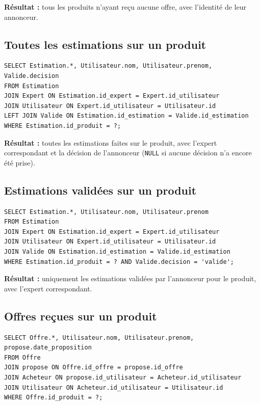 \documentclass{article}
\theoremstyle{plain}
\theoremstyle{definition}
\begin{document}
\noindent\textbf{Résultat :} tous les produits n'ayant reçu aucune
offre, avec l'identité de leur annonceur.
 
\subsection*{Toutes les estimations sur un produit}
 
\begin{verbatim}
SELECT Estimation.*, Utilisateur.nom, Utilisateur.prenom, Valide.decision
FROM Estimation
JOIN Expert ON Estimation.id_expert = Expert.id_utilisateur
JOIN Utilisateur ON Expert.id_utilisateur = Utilisateur.id
LEFT JOIN Valide ON Estimation.id_estimation = Valide.id_estimation
WHERE Estimation.id_produit = ?;
\end{verbatim}
 
\noindent\textbf{Résultat :} toutes les estimations faites sur le
produit, avec l'expert correspondant et la décision de l'annonceur
(\texttt{NULL} si aucune décision n'a encore été prise).
 
\subsection*{Estimations validées sur un produit}
 
\begin{verbatim}
SELECT Estimation.*, Utilisateur.nom, Utilisateur.prenom
FROM Estimation
JOIN Expert ON Estimation.id_expert = Expert.id_utilisateur
JOIN Utilisateur ON Expert.id_utilisateur = Utilisateur.id
JOIN Valide ON Estimation.id_estimation = Valide.id_estimation
WHERE Estimation.id_produit = ? AND Valide.decision = 'valide';
\end{verbatim}
 
\noindent\textbf{Résultat :} uniquement les estimations validées par
l'annonceur pour le produit, avec l'expert correspondant.
 
\subsection*{Offres reçues sur un produit}
 
\begin{verbatim}
SELECT Offre.*, Utilisateur.nom, Utilisateur.prenom, propose.date_proposition
FROM Offre
JOIN propose ON Offre.id_offre = propose.id_offre
JOIN Acheteur ON propose.id_utilisateur = Acheteur.id_utilisateur
JOIN Utilisateur ON Acheteur.id_utilisateur = Utilisateur.id
WHERE Offre.id_produit = ?;
\end{verbatim}
 
\end{document}
